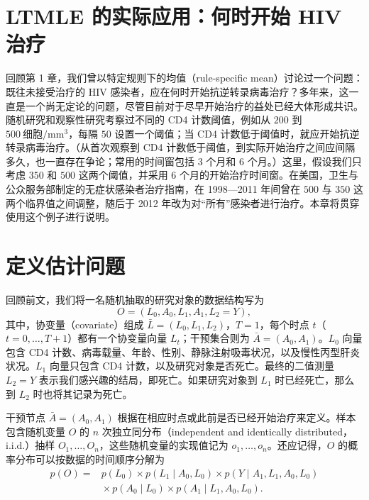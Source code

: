 \section{LTMLE 的实际应用：何时开始 HIV 治疗}
\label{sec:ch04-hiv-treatment}

回顾第 1 章，我们曾以特定规则下的均值（rule-specific mean）讨论过一个问题：既往未接受治疗的 HIV 感染者，应在何时开始抗逆转录病毒治疗？多年来，这一直是一个尚无定论的问题，尽管目前对于尽早开始治疗的益处已经大体形成共识。随机研究和观察性研究考察过不同的 CD4 计数阈值，例如从 $200$ 到 $500\ \text{细胞}/\mathrm{mm}^3$，每隔 $50$ 设置一个阈值；当 CD4 计数低于阈值时，就应开始抗逆转录病毒治疗。（从首次观察到 CD4 计数低于阈值，到实际开始治疗之间应间隔多久，也一直存在争论；常用的时间窗包括 3 个月和 6 个月。）这里，假设我们只考虑 $350$ 和 $500$ 这两个阈值，并采用 6 个月的开始治疗时间窗。在美国，卫生与公众服务部制定的无症状感染者治疗指南，在 1998—2011 年间曾在 $500$ 与 $350$ 这两个临界值之间调整，随后于 2012 年改为对“所有”感染者进行治疗。本章将贯穿使用这个例子进行说明。

\section{定义估计问题}
\label{sec:ch04-estimation-problem}

回顾前文，我们将一名随机抽取的研究对象的数据结构写为
\[
 O=(L_0,A_0,L_1,A_1,L_2=Y),
\]
其中，协变量（covariate）组成 $\bar L=(L_0,L_1,L_2)$，$T=1$，每个时点 $t$（$t=0,\ldots,T+1$）都有一个协变量向量 $L_t$；干预集合则为 $\bar A=(A_0,A_1)$。$L_0$ 向量包含 CD4 计数、病毒载量、年龄、性别、静脉注射吸毒状况，以及慢性丙型肝炎状况。$L_1$ 向量只包含 CD4 计数，以及研究对象是否死亡。最终的二值测量 $L_2=Y$ 表示我们感兴趣的结局，即死亡。如果研究对象到 $L_1$ 时已经死亡，那么到 $L_2$ 时也将其记录为死亡。

干预节点 $\bar A=(A_0,A_1)$ 根据在相应时点或此前是否已经开始治疗来定义。样本包含随机变量 $O$ 的 $n$ 次独立同分布（independent and identically distributed，i.i.d.）抽样 $O_1,\ldots,O_n$，这些随机变量的实现值记为 $o_1,\ldots,o_n$。还应记得，$O$ 的概率分布可以按数据的时间顺序分解为
\[
 \begin{aligned}
 p(O)={}&p(L_0)\times p(L_1\mid A_0,L_0)\times p(Y\mid A_1,L_1,A_0,L_0)\\
 &{}\times p(A_0\mid L_0)\times p(A_1\mid L_1,A_0,L_0).
 \end{aligned}
\]

